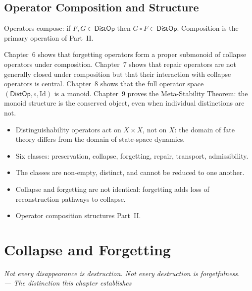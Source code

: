 \documentclass[12pt,twoside,openright]{book}
\newcommand{\distPairs}{X\times X}
\newcommand{\distOp}{\mathsf{DistOp}}
\newenvironment{epigraph}[2]{%
  \vspace{1em}\begin{flushright}
  \begin{minipage}{0.72\textwidth}
  \itshape\small #1\\[0.4em]
  \upshape\footnotesize\sffamily\color{DistGray}--- #2
  \end{minipage}\end{flushright}\vspace{1.5em}}{}
\newenvironment{chapsummary}{%
  \begin{tcolorbox}[colback=DistBlue!5,colframe=DistBlue,
    title={\faBookOpen\enspace Summary},
    fonttitle=\sffamily\bfseries\color{white},
    attach boxed title to top left={yshift=-2mm,xshift=4mm},
    boxed title style={colback=DistBlue,rounded corners}]
  \begin{itemize}[nosep,leftmargin=*]}{%
  \end{itemize}\end{tcolorbox}}
\begin{document}
\section{Operator Composition and Structure}

Operators compose: if $F,G\in\distOp$ then $G\circ F\in\distOp$.
Composition is the primary operation of Part~II.

Chapter~6 shows that forgetting operators form a proper
submonoid of collapse operators under composition.
Chapter~7 shows that repair operators are not generally
closed under composition but that their interaction with
collapse operators is central.
Chapter~8 shows that the full operator space $(\distOp,\circ,
\mathrm{Id})$ is a monoid.
Chapter~9 proves the Meta-Stability Theorem: the monoid
structure is the conserved object, even when individual
distinctions are not.

\begin{chapsummary}
\item Distinguishability operators act on $\distPairs$, not
  on $X$: the domain of fate theory differs from the domain
  of state-space dynamics.
\item Six classes: preservation, collapse, forgetting, repair,
  transport, admissibility.
\item The classes are non-empty, distinct, and cannot be
  reduced to one another.
\item Collapse and forgetting are not identical: forgetting
  adds loss of reconstruction pathways to collapse.
\item Operator composition structures Part~II.
\end{chapsummary}


\chapter{Collapse and Forgetting}
\label{ch:collapse-forgetting}

\begin{epigraph}{Not every disappearance is destruction.
  Not every destruction is forgetfulness.}{The distinction
  this chapter establishes}
\end{epigraph}
\end{document}
